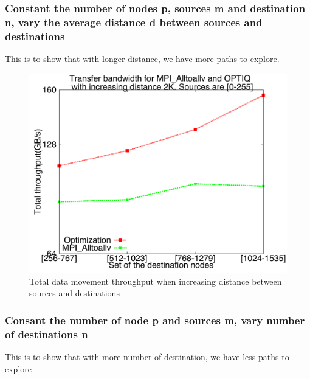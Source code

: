 \subsubsection{Constant the number of nodes p, sources m and destination n, vary the average distance d between sources and destinations}
This is to show that with longer distance, we have more paths to explore.

\begin{figure}[!htb]
\vspace{-0.1in}
\centering
\includegraphics[scale=0.30]{figures/incrdist.pdf}
\vspace{-0.1in}
\caption{Total data movement throughput when increasing distance between sources and destinations}
\vspace{-0.1in}
\label{fig:incrdist}
\end{figure}

\subsubsection{Consant the number of node p and sources m, vary number of destinations n}
This is to show that with more number of destination, we have less paths to explore

